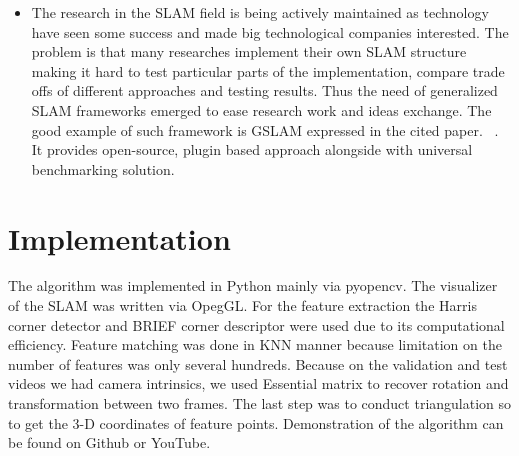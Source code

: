 \begin{itemize}
    \item The research in the SLAM field is being actively maintained as technology have seen some success and made big technological companies interested. The problem is that many researches implement their own SLAM structure making it hard to test particular parts of the implementation, compare trade offs of different approaches and testing results. Thus the need of generalized SLAM frameworks emerged to ease research work and ideas exchange. The good example of such framework is GSLAM expressed in the cited paper. ~\cite{GeneralFramework}. It provides open-source, plugin based approach alongside with universal benchmarking solution.
\end{itemize}

\pagebreak
\section{Implementation}

The algorithm was implemented in Python mainly via pyopencv. The visualizer of the SLAM was written via OpegGL. For the feature extraction the Harris corner detector and BRIEF corner descriptor were used due to its computational efficiency. Feature matching was done in KNN manner because limitation on the number of features was only several hundreds. Because on the validation and test videos we had camera intrinsics, we used Essential matrix to recover rotation and transformation between two frames. The last step was to conduct triangulation so to get the 3-D coordinates of feature points. Demonstration of the algorithm can be found on Github or YouTube.

\vspace{5mm} %


